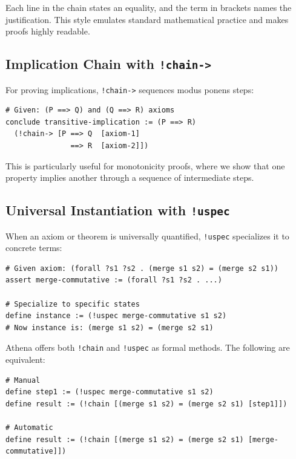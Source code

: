Each line in the chain states an equality, and the term in brackets names the justification. This style emulates standard mathematical practice and makes proofs highly readable.

\subsection{Implication Chain with \texttt{!chain->}}

For proving implications, \lstinline{!chain->} sequences modus ponens steps:

\begin{lstlisting}[language=Athena,style=athena,caption={Implication chain}]
# Given: (P ==> Q) and (Q ==> R) axioms
conclude transitive-implication := (P ==> R)
  (!chain-> [P ==> Q  [axiom-1]
               ==> R  [axiom-2]])
\end{lstlisting}

This is particularly useful for monotonicity proofs, where we show that one property implies another through a sequence of intermediate steps.

\subsection{Universal Instantiation with \texttt{!uspec}}

When an axiom or theorem is universally quantified, \lstinline{!uspec} specializes it to concrete terms:

\begin{lstlisting}[language=Athena,style=athena,caption={Universal specialization}]
# Given axiom: (forall ?s1 ?s2 . (merge s1 s2) = (merge s2 s1))
assert merge-commutative := (forall ?s1 ?s2 . ...)

# Specialize to specific states
define instance := (!uspec merge-commutative s1 s2)
# Now instance is: (merge s1 s2) = (merge s2 s1)
\end{lstlisting}

Athena offers both \lstinline{!chain} and \lstinline{!uspec} as formal methods. The following are equivalent:

\begin{lstlisting}[language=Athena,style=athena,caption={Automatic vs manual instantiation}]
# Manual
define step1 := (!uspec merge-commutative s1 s2)
define result := (!chain [(merge s1 s2) = (merge s2 s1) [step1]])

# Automatic
define result := (!chain [(merge s1 s2) = (merge s2 s1) [merge-commutative]])
\end{lstlisting}

